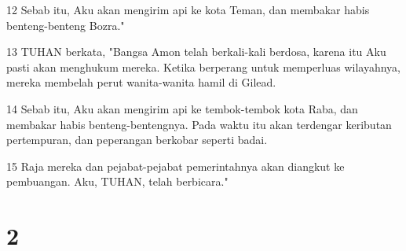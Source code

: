 \par 12 Sebab itu, Aku akan mengirim api ke kota Teman, dan membakar habis benteng-benteng Bozra."
\par 13 TUHAN berkata, "Bangsa Amon telah berkali-kali berdosa, karena itu Aku pasti akan menghukum mereka. Ketika berperang untuk memperluas wilayahnya, mereka membelah perut wanita-wanita hamil di Gilead.
\par 14 Sebab itu, Aku akan mengirim api ke tembok-tembok kota Raba, dan membakar habis benteng-bentengnya. Pada waktu itu akan terdengar keributan pertempuran, dan peperangan berkobar seperti badai.
\par 15 Raja mereka dan pejabat-pejabat pemerintahnya akan diangkut ke pembuangan. Aku, TUHAN, telah berbicara."

\chapter{2}

